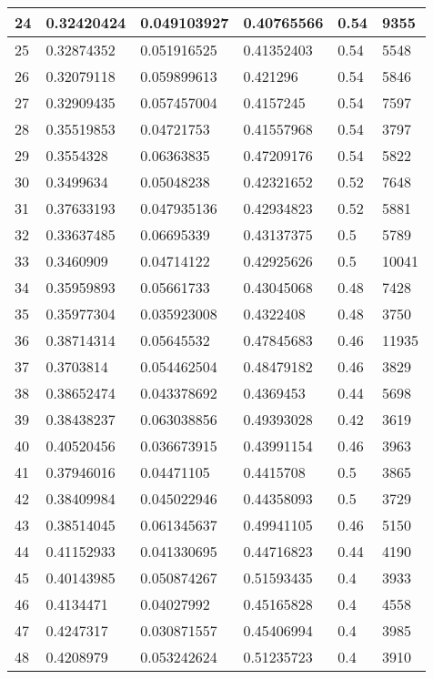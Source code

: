 \begin{longtable}{|l|l|l|l|l|l|}
24 & 0.32420424 & 0.049103927 & 0.40765566 & 0.54 & 9355 \\ \hline 
25 & 0.32874352 & 0.051916525 & 0.41352403 & 0.54 & 5548 \\ \hline 
26 & 0.32079118 & 0.059899613 & 0.421296 & 0.54 & 5846 \\ \hline 
27 & 0.32909435 & 0.057457004 & 0.4157245 & 0.54 & 7597 \\ \hline 
28 & 0.35519853 & 0.04721753 & 0.41557968 & 0.54 & 3797 \\ \hline 
29 & 0.3554328 & 0.06363835 & 0.47209176 & 0.54 & 5822 \\ \hline 
30 & 0.3499634 & 0.05048238 & 0.42321652 & 0.52 & 7648 \\ \hline 
31 & 0.37633193 & 0.047935136 & 0.42934823 & 0.52 & 5881 \\ \hline 
32 & 0.33637485 & 0.06695339 & 0.43137375 & 0.5 & 5789 \\ \hline 
33 & 0.3460909 & 0.04714122 & 0.42925626 & 0.5 & 10041 \\ \hline 
34 & 0.35959893 & 0.05661733 & 0.43045068 & 0.48 & 7428 \\ \hline 
35 & 0.35977304 & 0.035923008 & 0.4322408 & 0.48 & 3750 \\ \hline 
36 & 0.38714314 & 0.05645532 & 0.47845683 & 0.46 & 11935 \\ \hline 
37 & 0.3703814 & 0.054462504 & 0.48479182 & 0.46 & 3829 \\ \hline 
38 & 0.38652474 & 0.043378692 & 0.4369453 & 0.44 & 5698 \\ \hline 
39 & 0.38438237 & 0.063038856 & 0.49393028 & 0.42 & 3619 \\ \hline 
40 & 0.40520456 & 0.036673915 & 0.43991154 & 0.46 & 3963 \\ \hline 
41 & 0.37946016 & 0.04471105 & 0.4415708 & 0.5 & 3865 \\ \hline 
42 & 0.38409984 & 0.045022946 & 0.44358093 & 0.5 & 3729 \\ \hline 
43 & 0.38514045 & 0.061345637 & 0.49941105 & 0.46 & 5150 \\ \hline 
44 & 0.41152933 & 0.041330695 & 0.44716823 & 0.44 & 4190 \\ \hline 
45 & 0.40143985 & 0.050874267 & 0.51593435 & 0.4 & 3933 \\ \hline 
46 & 0.4134471 & 0.04027992 & 0.45165828 & 0.4 & 4558 \\ \hline 
47 & 0.4247317 & 0.030871557 & 0.45406994 & 0.4 & 3985 \\ \hline 
48 & 0.4208979 & 0.053242624 & 0.51235723 & 0.4 & 3910 \\ \hline 

\end{longtable}
